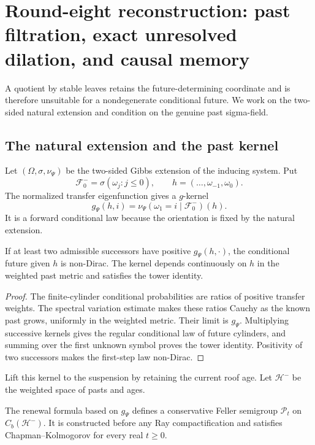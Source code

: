 \section{Round-eight reconstruction: past filtration, exact unresolved dilation, and causal memory}
\label{sec:r8-a4}

A quotient by stable leaves retains the future-determining coordinate and is
therefore unsuitable for a nondegenerate conditional future.  We work on the
two-sided natural extension and condition on the genuine past sigma-field.

\subsection{The natural extension and the past kernel}

Let $(\Omega,\sigma,\nu_\Psi)$ be the two-sided Gibbs extension of the inducing
system.  Put
\[
 \mathcal F^-_0=\sigma(\omega_j:j\le0),
 \qquad h=(\ldots,\omega_{-1},\omega_0).
\]
The normalized transfer eigenfunction gives a $g$-kernel
\[
 g_\Psi(h,i)=\nu_\Psi(\omega_1=i\mid\mathcal F^-_0)(h).
\]
It is a forward conditional law because the orientation is fixed by the
natural extension.

\begin{lemma}
\label{lem:r8-a4-past}
If at least two admissible successors have positive $g_\Psi(h,\cdot)$, the
conditional future given $h$ is non-Dirac.  The kernel depends continuously on
$h$ in the weighted past metric and satisfies the tower identity.
\end{lemma}

\begin{proof}
The finite-cylinder conditional probabilities are ratios of positive transfer
weights.  The spectral variation estimate makes these ratios Cauchy as the
known past grows, uniformly in the weighted metric.  Their limit is
$g_\Psi$.  Multiplying successive kernels gives the regular conditional law of
future cylinders, and summing over the first unknown symbol proves the tower
identity.  Positivity of two successors makes the first-step law non-Dirac.
\end{proof}

Lift this kernel to the suspension by retaining the current roof age.  Let
$\mathcal H^-$ be the weighted space of pasts and ages.

\begin{theorem}
\label{thm:r8-a4-feller}
The renewal formula based on $g_\Psi$ defines a conservative Feller semigroup
$\mathcal P_t$ on $C_b(\mathcal H^-)$.  It is constructed before any Ray
compactification and satisfies Chapman--Kolmogorov for every real $t\ge0$.
\end{theorem}

